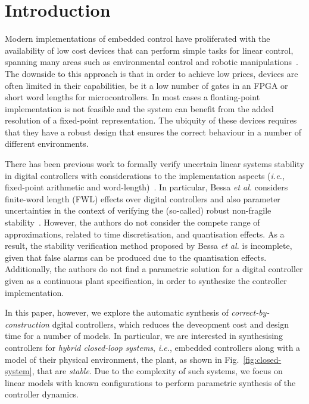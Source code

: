 \documentclass{sig-alternate-05-2015}
\begin{document}
%
%
\printccsdesc




\section{Introduction}

Modern implementations of embedded control have proliferated with the
availability of low cost devices that can perform simple tasks for
linear control, spanning many areas such as environmental control and
robotic manipulations~\cite{astrom1997computer,Franklin15}. 
The downside to this approach is that in order
to achieve low prices, devices are often limited in their
capabilities, be it a low number of gates in an FPGA or short word
lengths for microcontrollers. In most cases a floating-point
implementation is not feasible and the system can benefit from the
added resolution of a fixed-point representation. The ubiquity of
these devices requires that they have a robust design that ensures the
correct behaviour in a number of different environments.  %

There has been previous work to formally verify uncertain linear systems stability 
in digital controllers with considerations to the implementation aspects 
({\it i.e.}, fixed-point arithmetic and word-length)~\cite{Bessa16}.
In particular, Bessa {\it et al.} considers finite-word length
(FWL) effects over digital controllers and also parameter uncertainties
in the context of verifying the (so-called) robust non-fragile stability~\cite{bhattacharyya97}.
However, the authors do not consider the compete range of approximations, 
related to time discretisation, and quantisation effects. As a result,
the stability verification method proposed by Bessa {\it et al.} is incomplete, 
given that false alarms can be produced due to the quantisation effects. 
Additionally, the authors do not find a parametric solution for a digital controller 
given as a continuous plant specification, in order to synthesize the controller implementation.

In this paper, however, we explore the automatic synthesis of 
{\em correct-by-construction} dgital controllers, which 
reduces the deveopment cost and design time for a number of models.  
In particular, we are interested in synthesising controllers 
for {\em hybrid closed-loop systems}, {\it i.e.}, embedded controllers along with a model of their
physical environment, the plant, as shown in
Fig.~\ref{fig:closed-system}, that are {\em stable}.  Due to the complexity
of such systems, we focus on linear models with known configurations
to perform parametric synthesis of the controller dynamics.
\end{document}
